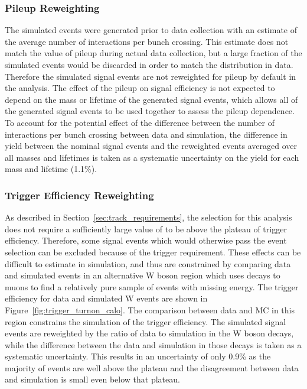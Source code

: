 \subsubsection{Pileup Reweighting}
The simulated events were generated prior to data collection with an estimate of the average number of interactions per bunch crossing.
This estimate does not match the value of pileup during actual data collection, but a large fraction of the simulated events would be discarded in order to match the distribution in data.
Therefore the simulated signal events are not reweighted for pileup by default in the analysis.
The effect of the pileup on signal efficiency is not expected to depend on the mass or lifetime of the generated signal events, which allows all of the generated signal events to be used together to assess the pileup dependence.
To account for the potential effect of the difference between the number of interactions per bunch crossing between data and simulation, the difference in yield between the nominal signal events and the reweighted events averaged over all masses and lifetimes is taken as a systematic uncertainty on the yield for each mass and lifetime (1.1\%).

\subsubsection{Trigger Efficiency Reweighting}
As described in Section~\ref{sec:track_requirements}, the selection for this analysis does not require a sufficiently large value of \met to be above the plateau of trigger efficiency.
Therefore, some signal events which would otherwise pass the event selection can be excluded because of the trigger requirement.
These effects can be difficult to estimate in simulation, and thus are constrained by comparing data and simulated events in an alternative W boson region which uses decays to muons to find a relatively pure sample of events with missing energy.
The trigger efficiency for data and simulated W events are shown in Figure~\ref{fig:trigger_turnon_calo}.
The comparison between data and MC in this region constrains the simulation of the trigger efficiency.
The simulated signal events are reweighted by the ratio of data to simulation in the W boson decays, while the difference between the data and simulation in those decays is taken as a systematic uncertainty.
This results in an uncertainty of only 0.9\% as the majority of events are well above the plateau and the disagreement between data and simulation is small even below that plateau.

